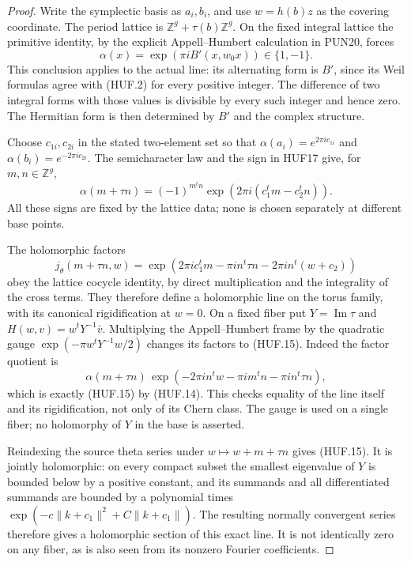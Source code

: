 \documentclass[11pt,a4paper]{article}
\numberwithin{equation}{section}
\theoremstyle{remark}\newtheorem{remark}[theorem]{Remark}
\begin{document}
\begin{proof}
Write the symplectic basis as \(a_i,b_i\), and
use \(w=h(b)z\) as the covering coordinate.
The period lattice is
\(\mathbb Z^g+\tau(b)\mathbb Z^g\).
On the fixed integral lattice the primitive
identity, by the explicit Appell--Humbert
calculation in PUN20, forces
\[
          \alpha(x)=\exp(\pi iB'(x,w_0x))\in\{1,-1\}.
 \tag{HUF.13}
\]
This conclusion applies to the actual line:
its alternating form is \(B'\), since its
Weil formulas agree with (HUF.2) for every
positive integer.  The difference of two
integral forms with those values is divisible
by every such integer and hence zero.
The Hermitian form is then determined by
\(B'\) and the complex structure.

Choose \(c_{1i},c_{2i}\) in the stated two-element
set so that
\(\alpha(a_i)=e^{2\pi i c_{1i}}\) and
\(\alpha(b_i)=e^{-2\pi i c_{2i}}\).
The semicharacter law and the sign in HUF17
give, for \(m,n\in\mathbb Z^g\),
\[
 \alpha(m+\tau n)=
       (-1)^{m^tn}\exp(2\pi i(c_1^tm-c_2^tn)).
 \tag{HUF.14}
\]
All these signs are fixed by the lattice data;
none is chosen separately at different base points.

The holomorphic factors
\[
 j_\theta(m+\tau n,w)=
 \exp\!\left(2\pi i c_1^tm-\pi i n^t\tau n
                  -2\pi i n^t(w+c_2)\right)
 \tag{HUF.15}
\]
obey the lattice cocycle identity, by direct
multiplication and the integrality of the
cross terms.  They therefore define a
holomorphic line on the torus family, with
its canonical rigidification at \(w=0\).
On a fixed fiber put \(Y=\operatorname{Im}\tau\)
and \(H(w,v)=w^tY^{-1}\bar v\).
Multiplying the Appell--Humbert frame by the
quadratic gauge
\(\exp(-\pi w^tY^{-1}w/2)\) changes its factors
to (HUF.15).  Indeed the factor quotient is
\[
 \alpha(m+\tau n)\,
 \exp(-2\pi i n^tw-\pi i m^tn-\pi i n^t\tau n),
 \]
which is exactly (HUF.15) by (HUF.14).
This checks equality of the line itself and
its rigidification, not only of its Chern
class.  The gauge is used on a single fiber;
no holomorphy of \(Y\) in the base is asserted.

Reindexing the source theta series under
\(w\mapsto w+m+\tau n\) gives (HUF.15).
It is jointly holomorphic: on every compact
subset the smallest eigenvalue of \(Y\) is
bounded below by a positive constant, and
its summands and all differentiated summands
are bounded by a polynomial times
\(\exp(-c\|k+c_1\|^2+C\|k+c_1\|)\).
The resulting normally convergent series
therefore gives a holomorphic section of
this exact line.  It is not identically
zero on any fiber, as is also seen from
its nonzero Fourier coefficients.
\end{proof}
\end{document}
